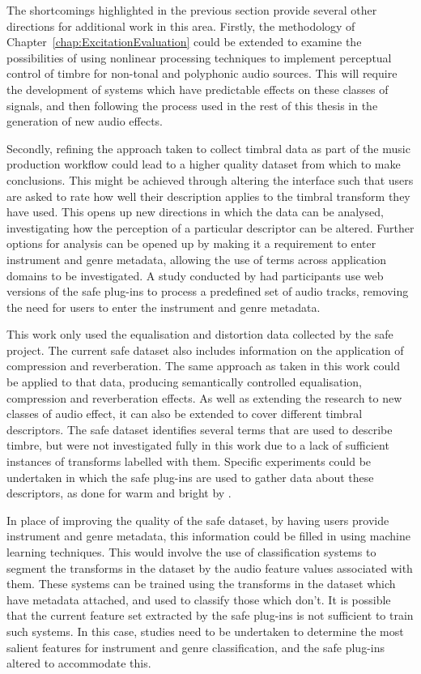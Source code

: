 	The shortcomings highlighted in the previous section provide several other directions for additional work in this
	area. Firstly, the methodology of Chapter~\ref{chap:ExcitationEvaluation} could be extended to examine the
	possibilities of using nonlinear processing techniques to implement perceptual control of timbre for non-tonal and
	polyphonic audio sources. This will require the development of systems which have predictable effects on these
	classes of signals, and then following the process used in the rest of this thesis in the generation of new audio
	effects.
	
	Secondly, refining the approach taken to collect timbral data as part of the music production workflow could lead to
	a higher quality dataset from which to make conclusions. This might be achieved through altering the interface such
	that users are asked to rate how well their description applies to the timbral transform they have used. This opens
	up new directions in which the data can be analysed, investigating how the perception of a particular descriptor can
	be altered. Further options for analysis can be opened up by making it a requirement to enter instrument and genre
	metadata, allowing the use of terms across application domains to be investigated. A study conducted by
	\citet{stasis2017audio} had participants use web versions of the \acrshort{safe} plug-ins to process a predefined
	set of audio tracks, removing the need for users to enter the instrument and genre metadata.

	This work only used the equalisation and distortion data collected by the \acrshort{safe} project. The current
	\acrshort{safe} dataset also includes information on the application of compression and reverberation. The same
	approach as taken in this work could be applied to that data, producing semantically controlled equalisation,
	compression and reverberation effects. As well as extending the research to new classes of audio effect, it can also
	be extended to cover different timbral descriptors. The \acrshort{safe} dataset identifies several terms that are
	used to describe timbre, but were not investigated fully in this work due to a lack of sufficient instances of
	transforms labelled with them. Specific experiments could be undertaken in which the \acrshort{safe} plug-ins are
	used to gather data about these descriptors, as done for warm and bright by \citet{stasis2015a}.

	In place of improving the quality of the \acrshort{safe} dataset, by having users provide instrument and genre
	metadata, this information could be filled in using machine learning techniques. This would involve the use of
	classification systems to segment the transforms in the dataset by the audio feature values associated with them.
	These systems can be trained using the transforms in the dataset which have metadata attached, and used to classify
	those which don't.  It is possible that the current feature set extracted by the \acrshort{safe} plug-ins is not
	sufficient to train such systems.  In this case, studies need to be undertaken to determine the most salient
	features for instrument and genre classification, and the \acrshort{safe} plug-ins altered to accommodate this.


